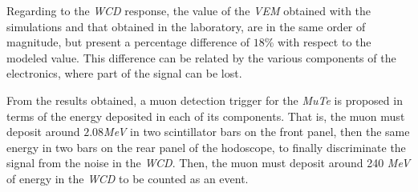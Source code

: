\documentclass[submitting]{nst}
\begin{document}
Regarding to the \textsl{WCD} response, the value of the \textsl{VEM} obtained with the simulations and that obtained in the laboratory, are in the same order of magnitude, but present a percentage difference of $18$\% with respect to the modeled value. This difference can be related by the various components of the electronics, where part of the signal can be lost.

From the results obtained, a muon detection trigger for the \textsl{MuTe} is proposed in terms of the energy deposited in each of its components. That is, the muon must deposit around $2.08$\textsl{MeV}   in two scintillator bars on the front panel, then the same energy in two bars on the rear panel of the hodoscope, to finally discriminate the signal from the noise in the \textsl{WCD}. Then, the muon must deposit around 240   \textsl{MeV}  of energy in the \textsl{WCD} to be counted as an event.





\end{document}
